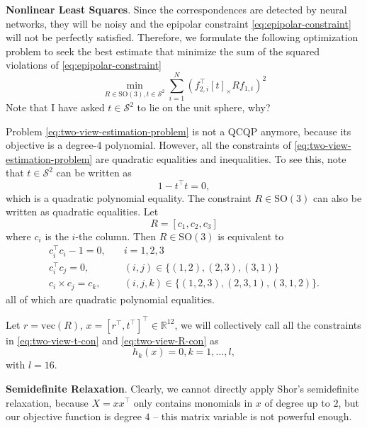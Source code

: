\documentclass[
]{book}
\theoremstyle{definition}
\theoremstyle{definition}
\theoremstyle{definition}
\theoremstyle{definition}
\theoremstyle{remark}
\begin{document}
\textbf{Nonlinear Least Squares}. Since the correspondences are detected by neural networks, they will be noisy and the epipolar constraint \eqref{eq:epipolar-constraint} will not be perfectly satisfied. Therefore, we formulate the following optimization problem to seek the best estimate that minimize the sum of the squared violations of \eqref{eq:epipolar-constraint}
\begin{equation}
\min_{R \in \mathrm{SO}(3), t \in \mathcal{S}^{2}} \sum_{i=1}^N (f_{2,i}^\top[t]_{\times} R f_{1,i})^2
\label{eq:two-view-estimation-problem}
\end{equation}
Note that I have asked \(t \in \mathcal{S}^{2}\) to lie on the unit sphere, why?

Problem \eqref{eq:two-view-estimation-problem} is not a QCQP anymore, because its objective is a degree-4 polynomial. However, all the constraints of \eqref{eq:two-view-estimation-problem} are quadratic equalities and inequalities. To see this, note that \(t \in \mathcal{S}^{2}\) can be written as
\begin{equation}
1 - t^\top t = 0,
\label{eq:two-view-t-con}
\end{equation}
which is a quadratic polynomial equality.
The constraint \(R \in \mathrm{SO}(3)\) can also be written as quadratic equalities. Let
\[
R = [c_1, c_2, c_3]
\]
where \(c_i\) is the \(i\)-the column. Then \(R\in \mathrm{SO}(3)\) is equivalent to
\begin{equation}
\begin{split}
c_i^\top c_i - 1= 0, & \quad i=1,2,3 \\
c_i^\top c_j = 0, & \quad (i,j) \in \{ (1,2),(2,3),(3,1) \} \\
c_i \times c_j = c_k,& \quad (i,j,k) \in \{ (1,2,3),(2,3,1),(3,1,2) \}. 
\end{split}
\label{eq:two-view-R-con}
\end{equation}
all of which are quadratic polynomial equalities.

Let \(r = \mathrm{vec}(R)\), \(x = [r^\top, t^\top]^\top\in \mathbb{R}^{12}\), we will collectively call all the constraints in \eqref{eq:two-view-t-con} and \eqref{eq:two-view-R-con} as
\[
h_k(x) = 0, k=1,\dots,l, 
\]
with \(l=16\).

\textbf{Semidefinite Relaxation}. Clearly, we cannot directly apply Shor's semidefinite relaxation, because \(X = xx^\top\) only contains monomials in \(x\) of degree up to \(2\), but our objective function is degree \(4\) -- this matrix variable is not powerful enough.
\end{document}
